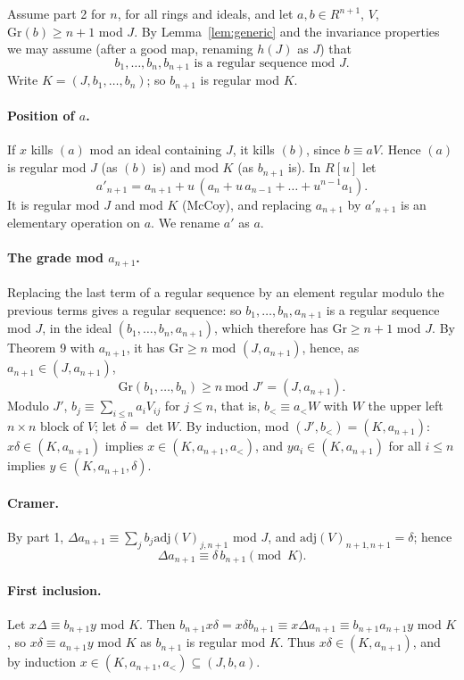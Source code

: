 \documentclass[11pt]{amsart}
\theoremstyle{remark}
\newcommand{\Gr}{\mathrm{Gr}}
\newcommand{\adj}{\mathrm{adj}}
\begin{document}
Assume part 2 for $n$, for all rings and ideals, and let $a,b\in R^{n+1}$,
$V$, $\Gr(b)\geq n+1$ mod $J$.  By Lemma~\ref{lem:generic} and the
invariance properties we may assume (after a good map, renaming $h(J)$
as $J$) that
\[
b_1,\dots,b_n,b_{n+1}\text{ is a regular sequence mod } J .
\]
Write $K=(J,b_1,\dots,b_n)$; so $b_{n+1}$ is regular mod $K$.

\paragraph{Position of $a$.}  If $x$ kills $(a)$ mod an ideal containing
$J$, it kills $(b)$, since $b\equiv aV$.  Hence $(a)$ is regular mod $J$
(as $(b)$ is) and mod $K$ (as $b_{n+1}$ is).  In $R[u]$ let
\[
a'_{n+1}=a_{n+1}+u\,(a_n+u\,a_{n-1}+\dots+u^{n-1}a_1).
\]
It is regular mod $J$ and mod $K$ (McCoy), and replacing $a_{n+1}$ by
$a'_{n+1}$ is an elementary operation on $a$.  We rename $a'$ as $a$.

\paragraph{The grade mod $a_{n+1}$.}  Replacing the last term of a
regular sequence by an element regular modulo the previous terms gives a
regular sequence: so $b_1,\dots,b_n,a_{n+1}$ is a regular sequence
mod $J$, in the ideal $(b_1,\dots,b_n,a_{n+1})$, which therefore has
$\Gr\geq n+1$ mod $J$.  By Theorem 9 with $a_{n+1}$, it has $\Gr\geq n$
mod $(J,a_{n+1})$, hence, as $a_{n+1}\in(J,a_{n+1})$,
\[
\Gr(b_1,\dots,b_n)\geq n\ \text{mod } J'=(J,a_{n+1}).
\]
Modulo $J'$, $b_j\equiv\sum_{i\leq n}a_iV_{ij}$ for $j\leq n$, that is,
$b_{<}\equiv a_{<}W$ with $W$ the upper left $n\times n$ block of $V$;
let $\delta=\det W$.  By induction, mod $(J',b_<)=(K,a_{n+1})$:
$x\delta\in(K,a_{n+1})$ implies $x\in(K,a_{n+1},a_<)$, and
$ya_i\in(K,a_{n+1})$ for all $i\leq n$ implies $y\in(K,a_{n+1},\delta)$.

\paragraph{Cramer.}  By part 1, $\Delta a_{n+1}\equiv\sum_jb_j\adj(V)_{j,n+1}$
mod $J$, and $\adj(V)_{n+1,n+1}=\delta$; hence
\[
\Delta a_{n+1}\equiv\delta\, b_{n+1}\pmod K .
\]

\paragraph{First inclusion.}  Let $x\Delta\equiv b_{n+1}y$ mod $K$.  Then
$b_{n+1}x\delta=x\delta b_{n+1}\equiv x\Delta a_{n+1}\equiv b_{n+1}a_{n+1}y$
mod $K$, so $x\delta\equiv a_{n+1}y$ mod $K$ as $b_{n+1}$ is regular mod
$K$.  Thus $x\delta\in(K,a_{n+1})$, and by induction
$x\in(K,a_{n+1},a_<)\subseteq(J,b,a)$.
\end{document}
